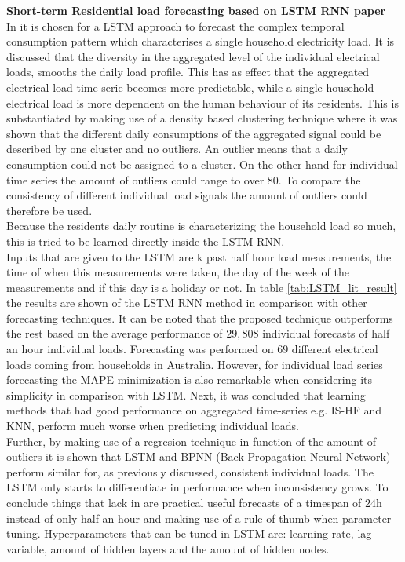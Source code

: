 \textbf{Short-term Residential load forecasting based on LSTM RNN paper}\\
In \cite{Kong2019} it is chosen for a LSTM approach to forecast the complex temporal consumption pattern which characterises a single household electricity load. It is discussed that the diversity in the aggregated level of the individual electrical loads, smooths the daily load profile. This has as effect that the aggregated electrical load time-serie becomes more predictable, while a single household electrical load is more dependent on the human behaviour of its residents. This is substantiated by making use of a density based clustering technique where it was shown that the different daily consumptions of the aggregated signal could be described by one cluster and no outliers. An outlier means that a daily consumption could not be assigned to a cluster. On the other hand for individual time series the amount of outliers could range to over $ 80 $. To compare the consistency of different individual load signals the amount of outliers could therefore be used.\\
Because the residents daily routine is characterizing the household load so much, this is tried to be learned directly inside the LSTM RNN.\\
Inputs that are given to the LSTM are k past half hour load measurements, the time of when this measurements were taken, the day of the week of the measurements and if this day is a holiday or not. In table \ref{tab:LSTM_lit_result} the results are shown of the LSTM RNN method in comparison with other forecasting techniques. It can be noted that the proposed technique outperforms the rest based on the average performance of $ 29,808 $ individual forecasts of half an hour individual loads. Forecasting was performed on $ 69 $ different electrical loads coming from households in Australia.  However, for individual load series forecasting the MAPE minimization is also remarkable when considering its simplicity in comparison with LSTM. Next, it was concluded that learning methods that had good performance on aggregated time-series e.g. IS-HF and KNN, perform much worse when predicting individual loads. \\
Further, by making use of a regresion technique in function of the amount of outliers it is shown that LSTM and BPNN (Back-Propagation Neural Network) perform similar for, as previously discussed, consistent individual loads. The LSTM only starts to differentiate in performance when inconsistency grows. To conclude things that lack in \cite{Kong2019} are practical useful forecasts of a timespan of $ 24 $h instead of only half an hour and making use of a rule of thumb when parameter tuning. Hyperparameters that can be tuned in LSTM are: learning rate, lag variable, amount of hidden layers and the amount of hidden nodes.

